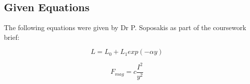 \subsection{Given Equations} The following equations were given by Dr P. Soposakis as part of the coursework brief:

\begin{equation} \label{eq:1}
    L = L_0 + L_1 exp(-\alpha y)
\end{equation}

\begin{equation} \label{eq:2}
    F_{mag}=c \frac{I^2}{y^2}
\end{equation}
